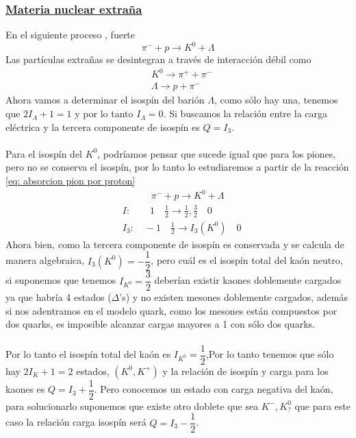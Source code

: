 \subsubsection{\underline{Materia nuclear extraña}}
En el siguiente proceso , fuerte
\begin{equation}
    \pi^- +p\longrightarrow K^0+\Lambda
    \label{eq: absorcion pion por proton}
\end{equation}
Las partículas extrañas se desintegran a través de interacción débil como
$$\begin{aligned}
    &K^0 \longrightarrow \pi^++\pi^-\\
    &\Lambda \longrightarrow p+\pi^-
\end{aligned}$$
Ahora vamos a determinar el isospín del barión $\Lambda$, como sólo hay una, tenemos que $2I_\Lambda+1=1$ y por lo tanto $I_\Lambda=0$. Si buscamos la relación entre la carga eléctrica y la tercera componente de isospín es $Q=I_3$. \\\\Para el isospín del $K^0$, podríamos pensar que sucede igual que para los piones, pero no se conserva el isospín, por lo tanto lo estudiaremos a partir de la reacción \ref{eq: absorcion pion por proton}
\begin{equation*}
    \begin{aligned}
        & \quad \quad \quad \pi^- +p\longrightarrow K^0+\Lambda\\
        &I: \quad \quad 1 \quad  \frac{1}{2} \longrightarrow \boxed{\frac{1}{2},\frac{3}{2}} \quad 0 \\
        & I_3: \quad -1 \quad \frac{1}{2} \longrightarrow  I_3(K^0) \quad  0
    \end{aligned}
\end{equation*}
Ahora bien, como la tercera componente de isospín es conservada y se calcula de manera algebraica, $I_3(K^0)=-\dfrac{1}{2}$, pero cuál es el isospín total del kaón neutro, si suponemos que tenemos $I_{K^0}=\dfrac{3}{2}$ deberían existir kaones doblemente cargados ya que habría 4 estados ($\Delta$'s) y no existen mesones doblemente cargados, además si nos adentramos en el modelo quark, como los mesones están compuestos por dos quarks, es imposible alcanzar cargas mayores a 1 con sólo dos quarks. \\\\Por lo tanto el isospín total del kaón es $I_{K^0}=\dfrac{1}{2}$,Por lo tanto tenemos que sólo hay $2I_{K}+1=2$ estados, $(K^0,K^+)$ y la relación de isospín y carga para los kaones es $Q=I_3+\dfrac{1}{2}$. Pero conocemos un estado con carga negativa del kaón, para solucionarlo suponemos que existe otro doblete que sea $K^-,K^0_?$ que para este caso la relación carga isospín será $Q=I_3-\dfrac{1}{2}$.\\\\
